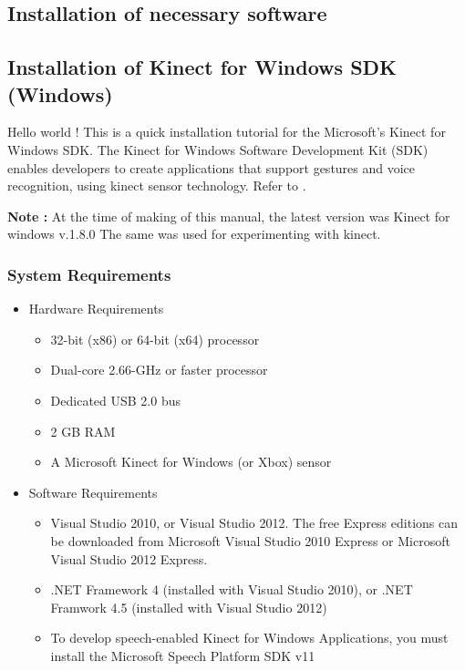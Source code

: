 



\begin{flushleft}

\chapter{Installation of necessary software}


\medskip
\section{\textbf{Installation of Kinect for Windows SDK (Windows)}}
\medskip
Hello world ! This is a quick installation tutorial for the Microsoft's Kinect for Windows SDK.
The Kinect for Windows Software Development Kit (SDK) enables developers to create applications that support gestures and voice recognition, using kinect sensor technology. Refer to \cite{download_sdk}.

\medskip
\textbf{Note : }
At the time of making of this manual, the latest version was Kinect for windows v.1.8.0 The same was used for experimenting with kinect.

\subsection{\textbf{ System Requirements}}
\medskip

\medskip
\begin{itemize}
\item Hardware Requirements
\medskip
\begin{itemize}
\item 32-bit (x86) or 64-bit (x64) processor
\item Dual-core 2.66-GHz or faster processor
\item Dedicated USB 2.0 bus
\item 2 GB RAM
\item A Microsoft Kinect for Windows (or Xbox) sensor
\end{itemize}
\medskip

\medskip
\item Software Requirements
\begin{itemize}
\item Visual Studio 2010, or Visual Studio 2012. The free Express editions can be downloaded from Microsoft Visual Studio 2010 Express or Microsoft Visual Studio 2012 Express.
\item .NET Framework 4 (installed with Visual Studio 2010), or .NET Framwork 4.5 (installed with Visual Studio 2012)
\item To develop speech-enabled Kinect for Windows Applications, you must install the Microsoft Speech Platform SDK v11
\medskip
\end{itemize}
\end{itemize}

\end{flushleft}
